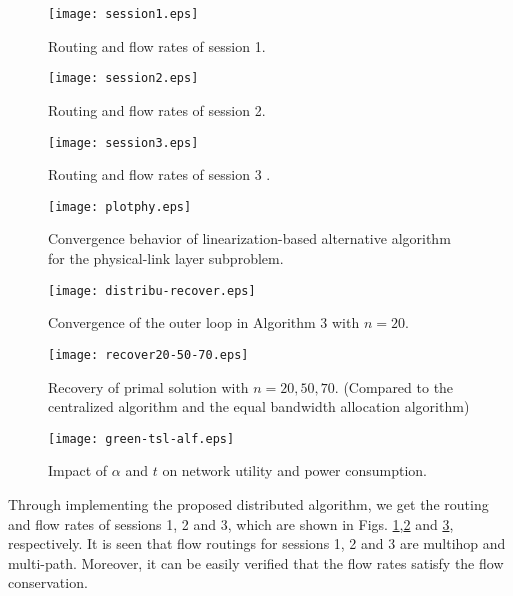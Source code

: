\documentclass[12pt,onecolumn,tworows]{IEEEtran}
\begin{document}
\begin{figure}
\centering
\texttt{[image: session1.eps]}
\centering
\caption{Routing and flow rates of session 1.}
\centering
\label{fig:fig2}
\centering
\end{figure}

\begin{figure}
\centering
\texttt{[image: session2.eps]}
\centering
\caption{Routing and flow rates of session 2.}
\centering
\label{fig:fig3}
\centering
\end{figure}

\begin{figure}
\centering
\texttt{[image: session3.eps]}
\centering
\caption{Routing and flow rates of session 3 .}
\centering
\label{fig:fig4}
\centering
\end{figure}

\begin{figure}
\centering
\texttt{[image: plotphy.eps]}
\centering
\caption{Convergence behavior of linearization-based alternative algorithm for the physical-link layer subproblem.}
\centering
\label{fig:fig5}
\centering
\end{figure}

\begin{figure}
\centering
\texttt{[image: distribu-recover.eps]}
\centering
\caption{Convergence of the outer loop in Algorithm 3 with $n=20$.}
\centering
\label{fig:fig6}
\centering
\end{figure}

\begin{figure}
\centering
\texttt{[image: recover20-50-70.eps]}
\centering
\caption{Recovery of primal solution with $n=20,50,70$. (Compared to the centralized algorithm and the equal bandwidth allocation algorithm)}
\centering
\label{fig:fig7}
\centering
\end{figure}

\begin{figure}
\centering
\texttt{[image: green-tsl-alf.eps]}
\centering
\caption{Impact of $\alpha$ and $t$ on network utility and power consumption.}
\centering
\label{fig:fig8}
\centering
\end{figure}


Through implementing the proposed distributed algorithm, we get the routing and flow rates of sessions 1, 2 and 3, which are shown in Figs. \ref{fig:fig2},\ref{fig:fig3} and \ref{fig:fig4}, respectively. It is seen that flow routings for sessions 1, 2 and 3 are multihop and multi-path. Moreover, it can be easily verified that the flow rates satisfy the flow conservation.
\end{document}
